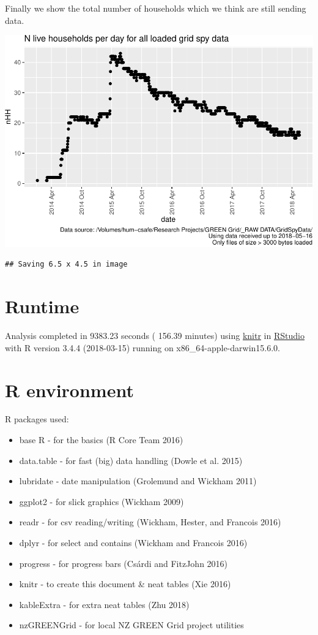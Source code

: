 \documentclass[]{article}
\providecommand{\tightlist}{%
  \setlength{\itemsep}{0pt}\setlength{\parskip}{0pt}}
\begin{document}
Finally we show the total number of households which we think are still
sending data.

\includegraphics{processNZGGElecCons1minData_v2_files/figure-latex/liveDataHouseholds-1.pdf}

\begin{verbatim}
## Saving 6.5 x 4.5 in image
\end{verbatim}

\section{Runtime}\label{runtime}

Analysis completed in 9383.23 seconds ( 156.39 minutes) using
\href{https://cran.r-project.org/package=knitr}{knitr} in
\href{http://www.rstudio.com}{RStudio} with R version 3.4.4 (2018-03-15)
running on x86\_64-apple-darwin15.6.0.

\section{R environment}\label{r-environment}

R packages used:

\begin{itemize}
\tightlist
\item
  base R - for the basics (R Core Team 2016)
\item
  data.table - for fast (big) data handling (Dowle et al. 2015)
\item
  lubridate - date manipulation (Grolemund and Wickham 2011)
\item
  ggplot2 - for slick graphics (Wickham 2009)
\item
  readr - for csv reading/writing (Wickham, Hester, and Francois 2016)
\item
  dplyr - for select and contains (Wickham and Francois 2016)
\item
  progress - for progress bars (Csárdi and FitzJohn 2016)
\item
  knitr - to create this document \& neat tables (Xie 2016)
\item
  kableExtra - for extra neat tables (Zhu 2018)
\item
  nzGREENGrid - for local NZ GREEN Grid project utilities
\end{itemize}
\end{document}
